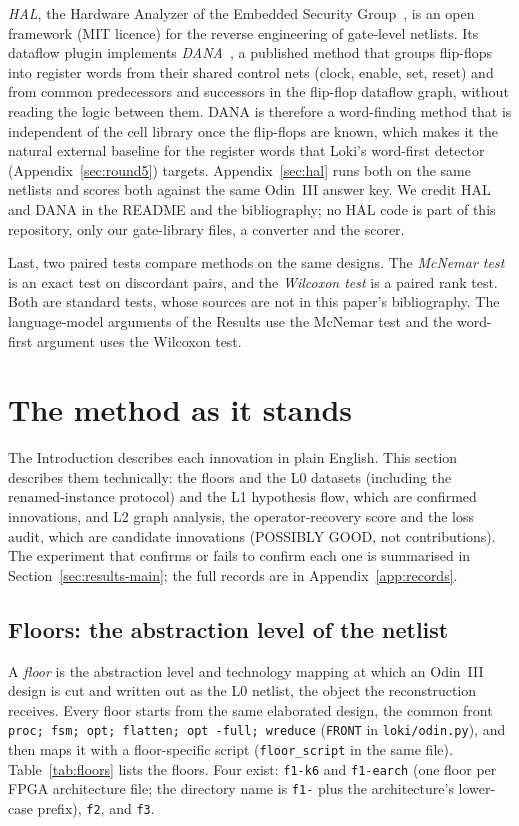 \documentclass[conference]{IEEEtran}
\newcommand{\code}[1]{\texttt{#1}}
\begin{document}
\emph{HAL}, the Hardware Analyzer of the Embedded Security Group~\cite{hal,fyrbiak2019hal}, is an open %
framework (MIT licence) for the reverse engineering of gate-level netlists. Its dataflow plugin
implements \emph{DANA}~\cite{albartus2020dana}, a published method that groups flip-flops into register words from their
shared control nets (clock, enable, set, reset) and from common predecessors and successors in
the flip-flop dataflow graph, without reading the logic between them. DANA is therefore a
word-finding method that is independent of the cell library once the flip-flops are known, which
makes it the natural external baseline for the register words that Loki's word-first detector
(Appendix~\ref{sec:round5}) targets. Appendix~\ref{sec:hal} runs both on the same netlists and
scores both against the same Odin~III answer key. We credit HAL and DANA in the README and the
bibliography; no HAL code is part of this repository, only our gate-library files, a converter
and the scorer.

Last, two paired tests compare methods on the same designs. The \emph{McNemar test} is an exact test on discordant pairs, %
and the \emph{Wilcoxon test} is a paired rank test. Both are standard tests, whose sources are not in this paper's bibliography. The language-model arguments of the Results use the McNemar test and the word-first argument uses the Wilcoxon test.

\section{The method as it stands}
\label{sec:innov}

The Introduction describes each innovation in plain English. This section describes them
technically: the floors and the L0 datasets (including the renamed-instance protocol) and the L1
hypothesis flow, which are confirmed innovations, and L2 graph analysis, the operator-recovery
score and the loss audit, which are candidate innovations (POSSIBLY GOOD, not contributions). The
experiment that confirms or fails to confirm each one is summarised in Section~\ref{sec:results-main}; the full records are in Appendix~\ref{app:records}.

\subsection{Floors: the abstraction level of the netlist}
\label{sec:floors}

A \emph{floor} is the abstraction level and technology mapping at which an Odin~III design is
cut and written out as the L0 netlist, the object the reconstruction receives. Every floor
starts from the same elaborated design, the common front \code{proc; fsm; opt; flatten; opt
-full; wreduce} (\code{FRONT} in \code{loki/odin.py}), and then maps it with a floor-specific
script (\code{floor\_script} in the same file). Table~\ref{tab:floors} lists the floors. Four
exist: \code{f1-k6} and \code{f1-earch} (one floor per FPGA architecture file; the
directory name is \code{f1-} plus the architecture's lower-case prefix), \code{f2}, and
\code{f3}.
\end{document}
